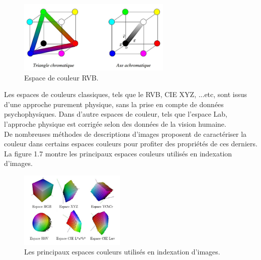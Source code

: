 \begin{figure}[H]
	\label{fig:espaceRVB}
	\centering
	\includegraphics[width=0.65\textwidth]{Figures/espaceRVB} %
	\caption{Espace de couleur RVB.}
\end{figure}

Les espaces de couleurs classiques, tels que le RVB, CIE XYZ, ...etc, sont issus d'une approche purement physique, sans la prise en compte de données psychophysiques. Dans d'autre espaces de couleur, tels que l'espace Lab, l'approche physique est corrigée selon des données de la vision humaine.\\

De nombreuses méthodes de descriptions d'images proposent de caractériser la couleur dans certains espaces couleurs pour profiter des propriétés de ces derniers. La figure 1.7 montre les principaux espaces couleurs utilisés en indexation d’images.

\begin{figure}[H]
	\label{fig:espaceCouleur}
	\centering
	\includegraphics[width=0.45\textwidth]{Figures/espaceCouleur} %
	\caption{Les principaux espaces couleurs utilisés en indexation d'images.}
	
\end{figure}

